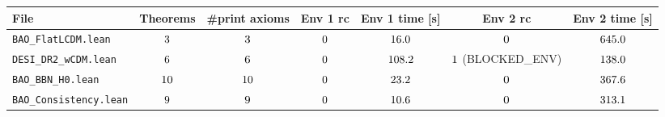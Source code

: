 \begin{tabular}{lcccccc}
\toprule
File & Theorems & \#print axioms & Env 1 rc & Env 1 time [s] & Env 2 rc & Env 2 time [s] \\
\midrule
\texttt{BAO\_FlatLCDM.lean} & $3$ & $3$ & $0$ & $16.0$ & $0$ & $645.0$ \\
\texttt{DESI\_DR2\_wCDM.lean} & $6$ & $6$ & $0$ & $108.2$ & $1$ (BLOCKED\_ENV) & $138.0$ \\
\texttt{BAO\_BBN\_H0.lean} & $10$ & $10$ & $0$ & $23.2$ & $0$ & $367.6$ \\
\texttt{BAO\_Consistency.lean} & $9$ & $9$ & $0$ & $10.6$ & $0$ & $313.1$ \\
\bottomrule
\end{tabular}
